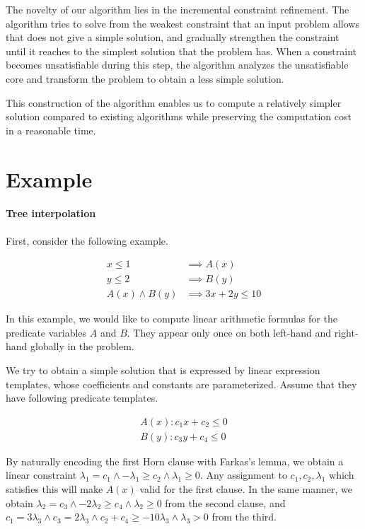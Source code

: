 \documentclass[master,final,12pt]{iscs-thesis}
\begin{document}
The novelty of our algorithm lies in the incremental constraint
refinement.  The algorithm tries to solve from the weakest constraint
that an input problem allows that does not give a simple solution, and
gradually strengthen the constraint until it reaches to the simplest
solution that the problem has.  When a constraint becomes
unsatisfiable during this step, the algorithm analyzes the
unsatisfiable core and transform the problem to obtain a less simple
solution.

This construction of the algorithm enables us to compute a relatively
simpler solution compared to existing algorithms while preserving the
computation cost in a reasonable time.

\section{Example}

\paragraph {Tree interpolation}
First, consider the following example.

\begin{align*}
x \leq 1 & \implies A(x) \\
y \leq 2 & \implies B(y) \\
A(x) \wedge B(y) & \implies 3x+2y \leq 10
\end{align*}

In this example, we would like to compute linear arithmetic formulas
for the predicate variables $A$ and $B$.  They appear only once on
both left-hand and right-hand globally in the problem.

We try to obtain a simple solution that is expressed by linear
expression templates, whose coefficients and constants are
parameterized.  Assume that they have following predicate templates.

\begin{align*}
A(x) : c_1 x + c_2 \leq 0 \\
B(y) : c_3 y + c_4 \leq 0
\end{align*}

By naturally encoding the first Horn clause with Farkas's lemma, we
obtain a linear constraint
$ \lambda_1 = c_1 \wedge - \lambda_1 \geq c_2 \wedge \lambda_1 \geq 0 $.
Any assignment to $ c_1, c_2, \lambda_1 $ which satisfies this will
make $A(x)$ valid for the first clause.  In the same manner, we obtain
$ \lambda_2 = c_3 \wedge - 2 \lambda_2 \geq c_4 \wedge \lambda_2 \geq 0 $
from the second clause, and
$ c_1 = 3 \lambda_3 \wedge c_3 = 2 \lambda_3 \wedge c_2 + c_4 \geq -10 \lambda_3 \wedge \lambda_3 > 0 $
from the third.
\end{document}
